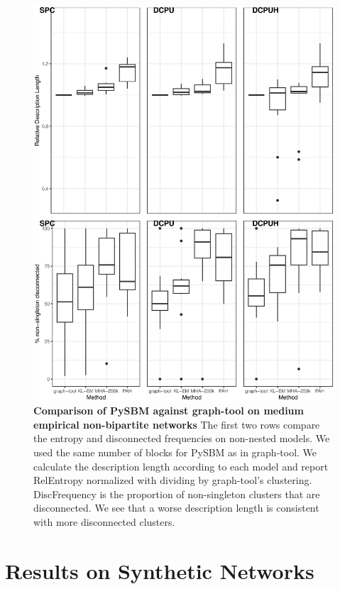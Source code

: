 \documentclass[aps,pre,superscriptaddress]{article}
\begin{document}
\begin{figure}[!htpb]
	\centering
	\includegraphics[width=\textwidth]{figures/pysbm_v_graph_tool_flat.eps}
	\caption[]{
		\textbf{Comparison of PySBM against graph-tool on medium empirical non-bipartite networks}
		The first two rows compare the entropy and disconnected frequencies on non-nested models.%
		We used the same number of blocks for PySBM as in graph-tool.%
		We calculate the description length according to each model and report RelEntropy normalized with dividing by graph-tool's clustering.
		DiscFrequency is the proportion of non-singleton clusters that are disconnected.
		We see that a worse description length is consistent with more disconnected clusters.
	}
	\label{fig:comparison_flat.pdf}
\end{figure}

\clearpage
\section{Results on Synthetic Networks}
\end{document}
